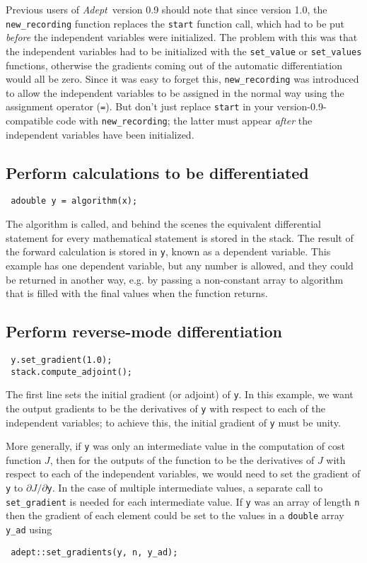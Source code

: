 \documentclass[a4,oneside]{book}
\def\codesize{\small}
\def\Adept{\emph{Adept}}
\def\code#1{{\codesize\texttt{#1}}}
\begin{document}
Previous users of \Adept\ version 0.9 should note that since version
1.0, the \code{new\_recording} function replaces the \code{start}
function call, which had to be put \emph{before} the independent
variables were initialized.  The problem with this was that the
independent variables had to be initialized with the \code{set\_value}
or \code{set\_values} functions, otherwise the gradients coming out of
the automatic differentiation would all be zero.  Since it was easy to
forget this, \code{new\_recording} was introduced to allow the
independent variables to be assigned in the normal way using the
assignment operator (\code{=}).  But don't just replace \code{start}
in your version-0.9-compatible code with \code{new\_recording}; the
latter must appear \emph{after} the independent variables have been
initialized.

\subsection{Perform calculations to be differentiated}
\begin{lstlisting}
 adouble y = algorithm(x);
\end{lstlisting}
The algorithm is called, and behind the scenes the equivalent
differential statement for every mathematical statement is stored in the
stack. The result of the forward calculation is stored in \code{y},
known as a dependent variable. This example has one dependent
variable, but any number is allowed, and they could be returned in
another way, e.g. by passing a non-constant array to algorithm that is
filled with the final values when the function returns.
%
\subsection{Perform reverse-mode differentiation}

\begin{lstlisting}
 y.set_gradient(1.0);
 stack.compute_adjoint();
\end{lstlisting}
The first line sets the initial gradient (or adjoint) of \code{y}. In
this example, we want the output gradients to be the derivatives of
\code{y} with respect to each of the independent variables; to achieve
this, the initial gradient of \code{y} must be unity.

More generally, if \code{y} was only an intermediate value in the
computation of cost function $J$, then for the outputs of the
function to be the derivatives of $J$ with respect to each of the
independent variables, we would need to set the gradient of
\code{y} to $\partial J/\partial$\code{y}. In the case of multiple
intermediate values, a separate call to \code{set\_gradient} is needed
for each intermediate value.  If \code{y} was an array of length
\code{n} then the gradient of each element could be set to the values in a \code{double} array \code{y\_ad} using
\begin{lstlisting}
 adept::set_gradients(y, n, y_ad);
\end{lstlisting}
\end{document}
